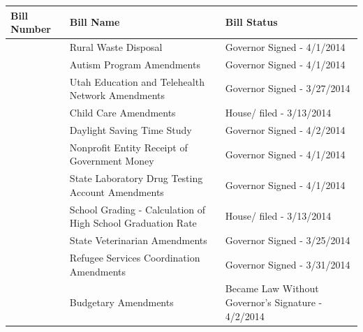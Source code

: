 \documentclass{article}
\begin{document}
\begin{tabular}{lll}
\toprule
Bill Number & Bill Name & Bill Status \\
\midrule
 & Rural Waste Disposal & Governor Signed - 4/1/2014 \\
 & Autism Program Amendments & Governor Signed - 4/1/2014 \\
 & Utah Education and Telehealth Network Amendments & Governor Signed - 3/27/2014 \\
 & Child Care Amendments & House/ filed - 3/13/2014 \\
 & Daylight Saving Time Study & Governor Signed - 4/2/2014 \\
 & Nonprofit Entity Receipt of Government Money & Governor Signed - 4/1/2014 \\
 & State Laboratory Drug Testing Account Amendments & Governor Signed - 4/1/2014 \\
 & School Grading - Calculation of High School Graduation Rate & House/ filed - 3/13/2014 \\
 & State Veterinarian Amendments & Governor Signed - 3/25/2014 \\
 & Refugee Services Coordination Amendments & Governor Signed - 3/31/2014 \\
 & Budgetary Amendments & Became Law Without Governor's Signature - 4/2/2014 \\
\bottomrule
\end{tabular}
\end{document}
